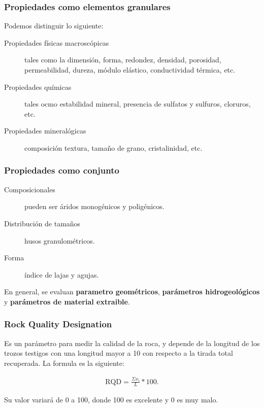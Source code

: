 \documentclass[../main.tex]{subfiles}
\begin{document}
\subsubsection{Propiedades como elementos granulares}

Podemos distinguir lo siguiente:

\begin{description}
  \item[Propiedades físicas macroscópicas] tales como la dimensión, forma, 
    redondez, densidad, porosidad, permeabilidad, dureza, módulo elástico, 
    conductividad térmica, etc.
  \item[Propiedades químicas] tales ocmo estabilidad mineral, presencia de
    sulfatos y sulfuros, cloruros, etc.
  \item[Propiedades mineralógicas] composición textura, tamaño de grano, 
    cristalinidad, etc.
\end{description}

\subsubsection{Propiedades como conjunto}

\begin{description}
  \item[Composicionales] pueden ser áridos monogénicos y poligénicos. 
  \item[Distribución de tamaños] husos granulométricos.
  \item[Forma] índice de lajas y agujas.
\end{description}

En general, se evaluan \textbf{parametro geométricos}, \textbf{parámetros hidrogeológicos} 
y \textbf{parámetros de material extraible}.

\subsubsection{Rock Quality Designation}

Es un parámetro para medir la calidad de la roca, y depende de la longitud de 
los trozos testigos con una longitud mayor a 10 con respecto a la tirada total
recuperada. La formula es la siguiente:

\begin{align*}
  \text{RQD} = \frac{\Sigma x_{i}}{L}*100
.\end{align*}

Su valor variará de 0 a 100, donde 100 es excelente y 0 es muy malo.
\end{document}
